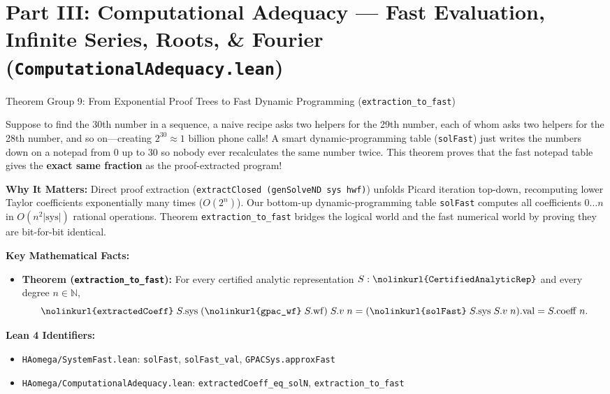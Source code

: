 \documentclass[11pt,a4paper]{article}
\newcommand{\N}{\ensuremath{\mathbb{N}}}
\newcommand{\lean}[1]{\texttt{\nolinkurl{#1}}}
\begin{document}
\newpage
\section{Part III: Computational Adequacy --- Fast Evaluation, Infinite Series, Roots, \& Fourier (\texorpdfstring{\lean{ComputationalAdequacy.lean}}{ComputationalAdequacy.lean})}

\begin{thmcard}{Theorem Group 9: From Exponential Proof Trees to Fast Dynamic Programming (\lean{extraction\_to\_fast})}
\begin{eli5box}
Suppose to find the 30th number in a sequence, a naive recipe asks two helpers for the 29th number, each of whom asks two helpers for the 28th number, and so on---creating $2^{30} \approx 1\text{ billion}$ phone calls! A smart dynamic-programming table (\lean{solFast}) just writes the numbers down on a notepad from $0$ up to $30$ so nobody ever recalculates the same number twice. This theorem proves that the fast notepad table gives the \textbf{exact same fraction} as the proof-extracted program!
\end{eli5box}

\textbf{Why It Matters:}
Direct proof extraction (\lean{extractClosed (genSolveND sys hwf)}) unfolds Picard iteration top-down, recomputing lower Taylor coefficients exponentially many times ($O(2^n)$). Our bottom-up dynamic-programming table \lean{solFast} computes all coefficients $0 \dots n$ in $O(n^2 |\mathrm{sys}|)$ rational operations. Theorem \lean{extraction_to_fast} bridges the logical world and the fast numerical world by proving they are bit-for-bit identical.

\textbf{Key Mathematical Facts:}
\begin{itemize}
  \item \textbf{Theorem (\lean{extraction_to_fast}):} For every certified analytic representation $S : \lean{CertifiedAnalyticRep}$ and every degree $n \in \N$,
  \[
    \lean{extractedCoeff}\;S.\mathrm{sys}\;(\lean{gpac\_wf}\;S.\mathrm{wf})\;S.v\;n
    = (\lean{solFast}\;S.\mathrm{sys}\;S.v\;n).\mathrm{val}
    = S.\mathrm{coeff}\;n.
  \]
\end{itemize}

\textbf{Lean 4 Identifiers:}
\begin{itemize}
  \item \lean{HAomega/SystemFast.lean}: \lean{solFast}, \lean{solFast_val}, \lean{GPACSys.approxFast}
  \item \lean{HAomega/ComputationalAdequacy.lean}: \lean{extractedCoeff_eq_solN}, \lean{extraction_to_fast}
\end{itemize}
\end{thmcard}
\end{document}
